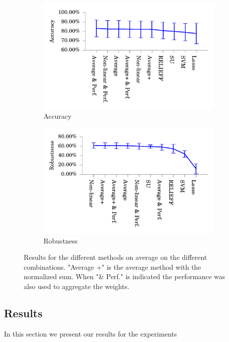 \documentclass[twoside,11pt]{article}
\begin{document}
\begin{figure}[!t]
\centering
\begin{subfigure}{.5\textwidth}
  \centering
  \includegraphics[width=1.07\textwidth]{images/Accuracy_of_the_different_methods.pdf}
  \caption{Accuracy}
  \label{fig:methods_accuracy}
\end{subfigure}%
\begin{subfigure}{.5\textwidth}
  \centering
  \includegraphics[width=1.07\textwidth]{images/Robustness_of_the_different_methods.pdf}
  \caption{Robustness}
  \label{fig:methods_robustness}
\end{subfigure}
\caption{Results for the different methods on average on the different combinations. "Average +" is the average method with the normalized sum. When "\& Perf." is indicated the performance was also used to aggregate the weights.}
\label{fig:methods_results}
\end{figure}


\subsection{Results}
In this section we present our results for the experiments
\end{document}
